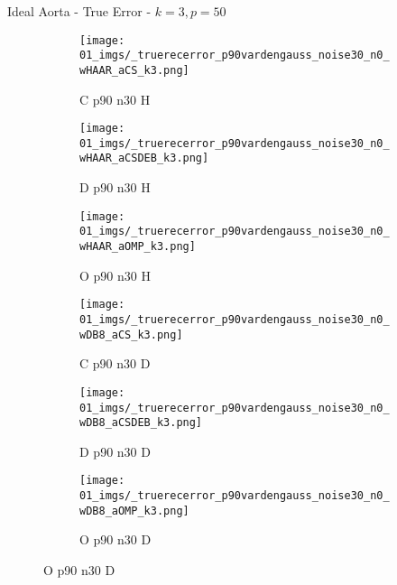 \begin{frame}{Ideal Aorta - True Error - $k=3,p=50$}{}
\begin{figure}
\begin{subfigure}{0.13\textwidth}
\texttt{[image: 01\_imgs/\_truerecerror\_p90vardengauss\_noise30\_n0\_wHAAR\_aCS\_k3.png]}
\caption*{\tiny C p90 n30 H}
\end{subfigure}
\begin{subfigure}{0.13\textwidth}
\texttt{[image: 01\_imgs/\_truerecerror\_p90vardengauss\_noise30\_n0\_wHAAR\_aCSDEB\_k3.png]}
\caption*{\tiny D p90 n30 H}
\end{subfigure}
\begin{subfigure}{0.13\textwidth}
\texttt{[image: 01\_imgs/\_truerecerror\_p90vardengauss\_noise30\_n0\_wHAAR\_aOMP\_k3.png]}
\caption*{\tiny O p90 n30 H}
\end{subfigure}
\begin{subfigure}{0.13\textwidth}
\texttt{[image: 01\_imgs/\_truerecerror\_p90vardengauss\_noise30\_n0\_wDB8\_aCS\_k3.png]}
\caption*{\tiny C p90 n30 D}
\end{subfigure}
\begin{subfigure}{0.13\textwidth}
\texttt{[image: 01\_imgs/\_truerecerror\_p90vardengauss\_noise30\_n0\_wDB8\_aCSDEB\_k3.png]}
\caption*{\tiny D p90 n30 D}
\end{subfigure}
\begin{subfigure}{0.13\textwidth}
\texttt{[image: 01\_imgs/\_truerecerror\_p90vardengauss\_noise30\_n0\_wDB8\_aOMP\_k3.png]}
\caption*{\tiny O p90 n30 D}
\end{subfigure}
\end{figure}
\end{frame}


